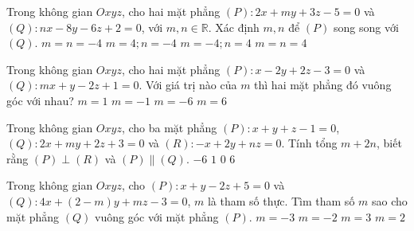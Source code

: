 \begin{ex}%
	Trong không gian $Oxyz$, cho hai mặt phẳng $(P)\colon 2x+my+3z-5=0$ và $(Q)\colon nx-8y-6z+2=0$, với $m,n\in \mathbb{R}$. Xác định $m,n$ để $(P)$ song song với $(Q)$.
\choice
{$m=n=-4$}
{\True $m=4;n=-4$}
{$m=- 4;n=4$}
{$m=n=4$}
\end{ex}

\begin{ex}%
	Trong không gian $Oxyz$, cho hai mặt phẳng $(P)\colon x-2y+2z-3=0$ và $(Q)\colon mx+y-2z+1=0$. Với giá trị nào của $m$ thì hai mặt phẳng đó vuông góc với nhau?
\choice
{$m=1$}
{$m=-1$}
{$m=-6$}
{\True $m=6$}
\end{ex}

\begin{ex}%
	Trong không gian $Oxyz$, cho ba mặt phẳng $(P)\colon x+y+z-1=0$, $(Q)\colon 2x+my+2z+3=0$ và $(R)\colon -x+2y+nz=0$. Tính tổng $m+2n$, biết rằng $(P)\perp (R)$ và $(P)\parallel (Q)$.
\choice
{$-6$}
{$1$}
{\True $0$}
{$6$}
\end{ex}

\begin{ex}%
	Trong không gian $Oxyz$, cho $(P)\colon x+y-2z+5=0$ và $(Q)\colon 4x+(2-m)y+mz-3=0$, $m$ là tham số thực. Tìm tham số $m$ sao cho mặt phẳng $(Q)$ vuông góc với mặt phẳng $(P)$.
\choice
{$m=-3$}
{$m=-2$}
{$m=3$}
{\True $m=2$}
\end{ex}

